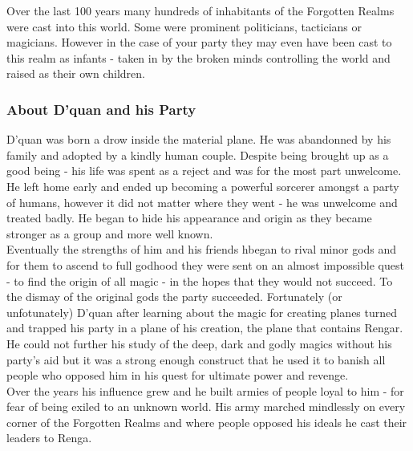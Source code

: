 \documentclass[10pt,twoside,twocolumn]{article}
\begin{document}
Over the last 100 years many hundreds of inhabitants of the Forgotten Realms were cast into this world. Some were prominent politicians, tacticians or magicians. However in the case of your party they may even have been cast to this realm as infants - taken in by the broken minds controlling the world and raised as their own children.\\

\subsubsection{About D'quan and his Party}
D'quan was born a drow inside the material plane. He was abandonned by his family and adopted by a kindly human couple. Despite being brought up as a good being - his life was spent as a reject and was for the most part unwelcome.\\

He left home early and ended up becoming a powerful sorcerer amongst a party of humans, however it did not matter where they went - he was unwelcome and treated badly. He began to hide his appearance and origin as they became stronger as a group and more well known.\\

Eventually the strengths of him and his friends hbegan to rival minor gods and for them to ascend to full godhood they were sent on an almost impossible quest - to find the origin of all magic - in the hopes that they would not succeed. To the dismay of the original gods the party succeeded. Fortunately (or unfotunately) D'quan after learning about the magic for creating planes turned and trapped his party in a plane of his creation, the plane that contains Rengar. He could not further his study of the deep, dark and godly magics without his party's aid but it was a strong enough construct that he used it to banish all people who opposed him in his quest for ultimate power and revenge.\\

Over the years his influence grew and he built armies of people loyal to him - for fear of being exiled to an unknown world. His army marched mindlessly on every corner of the Forgotten Realms and where people opposed his ideals he cast their leaders to Renga.\\
\end{document}
